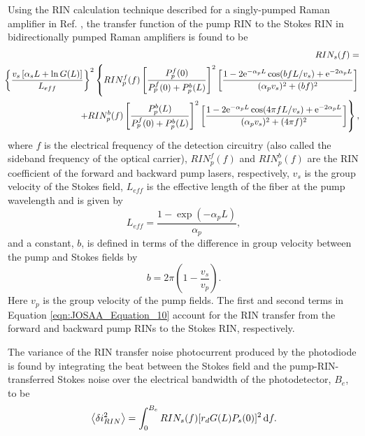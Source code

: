 Using the RIN calculation technique described for a singly-pumped Raman amplifier in Ref. \cite{fludger2001pump}, the transfer function of the pump RIN to the Stokes RIN in bidirectionally pumped Raman amplifiers is found to be
\begin{eqnarray}
&&\hspace{-0.7cm}RIN_s(f) = \nonumber\\
&&\hspace{-0.5cm}\left\{\frac{v_s\left[\alpha_s L + \ln G(L)\right]}{L_{eff}}\right\}^2  
 \left\{RIN_p^f(f) \left[\frac{P_p^f(0)}{P_p^f(0)+P_p^b(L)}\right]^2 \left[\frac{1-2\mathrm{e}^{-\alpha_p L}\cos(bfL/v_s)+\mathrm{e}^{-2 \alpha_p L}}{(\alpha_p v_s)^2+(b f)^2}\right] \right.\nonumber\\
&&\hspace{-0.5cm} \left.+RIN_p^b(f) \left[\frac{P_p^b(L)}{P_p^f(0)+P_p^b(L)}\right]^2 \left[\frac{1-2\mathrm{e}^{-\alpha_p L}\cos(4 \pi f L/v_s)+\mathrm{e}^{-2 \alpha_p L}}{(\alpha_p v_s)^2+(4 \pi f)^2}\right]\right\},\label{eqn:JOSAA_Equation_10}
\end{eqnarray}
where $f$ is the electrical frequency of the detection circuitry (also called the sideband frequency of the optical carrier), $RIN_p^f(f)$ and $RIN_p^b(f)$ are the RIN coefficient of the forward and backward pump lasers, respectively, $v_s$ is the group velocity of the Stokes field, $L_{eff}$ is the effective length of the fiber at the pump wavelength and is given by
\begin{equation}
L_{eff}=\frac{1-\exp(-\alpha_p L)}{\alpha_p},\label{eqn:JOSAA_Equation_11}
\end{equation}
and a constant, $b$, is defined in terms of the difference in group velocity between the pump and Stokes fields by
\begin{equation}
b = 2\pi\left(1-\frac{v_s}{v_p}\right).\label{eqn:JOSAA_Equation_12}
\end{equation}
Here $v_p$ is the group velocity of the pump fields. The first and second terms in Equation \eqref{eqn:JOSAA_Equation_10} account for the RIN transfer from the forward and backward pump RINs to the Stokes RIN, respectively.

The variance of the RIN transfer noise photocurrent produced by the photodiode is found by integrating the beat between the Stokes field and the pump-RIN-transferred Stokes noise over the electrical bandwidth of the photodetector, $B_e$, to be
\begin{equation}
\left\langle \delta i_{RIN}^2\right\rangle = \int_0^{B_e}RIN_s(f) [r_d G(L) P_s(0)]^2 \,\mathrm{d} f.\label{eqn:JOSAA_Equation_13}
\end{equation}

